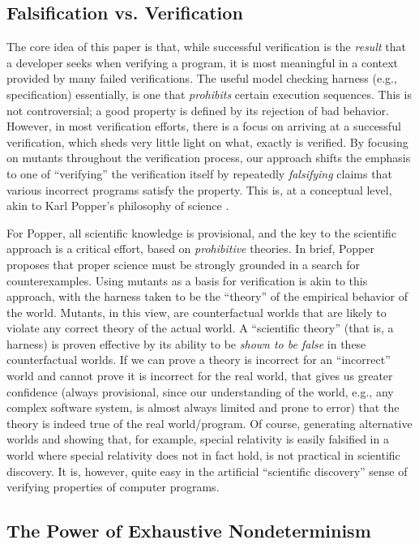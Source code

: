\documentclass[conference]{IEEEtran}
\begin{document}
\subsection{Falsification vs. Verification}

The core idea of this paper is that, while successful verification is
the \emph{result} that a developer seeks when verifying a program, it
is most meaningful in a context provided by many failed verifications.
The useful model checking harness (e.g., specification) essentially,
is one that \emph{prohibits} certain execution sequences.  This is not
controversial; a good property is defined by its rejection of bad
behavior.  However, in most verification efforts, there is a focus on
arriving at a successful verification, which sheds very little light
on what, exactly is verified.  By focusing on mutants throughout the
verification process, our approach shifts the emphasis to one of
``verifying'' the verification itself by repeatedly \emph{falsifying}
claims that various incorrect programs satisfy the property.  This is,
at a conceptual level, akin to Karl Popper's philosophy of science
\cite{Popper}.

For Popper, all scientific knowledge is provisional, and the key to
the scientific approach is a critical effort, based on
\emph{prohibitive} theories.  In brief, Popper proposes that proper
science must be strongly grounded in a search for counterexamples.
Using mutants as a basis for verification is akin to this approach,
with the harness taken to be the ``theory'' of the empirical behavior
of the world.  Mutants, in this view, are counterfactual worlds that
are likely to violate any correct theory of the actual world.  A
``scientific theory'' (that is, a harness) is proven effective by its
ability to be \emph{shown to be false} in these counterfactual worlds.
If we can prove a theory is incorrect for an ``incorrect'' world and
cannot prove it is incorrect for the real world, that gives us greater
confidence (always provisional, since our understanding of the world,
e.g., any complex software system, is almost always limited and prone
to error) that the theory is indeed true of the real world/program.
Of course, generating alternative worlds and showing that, for
example, special relativity is easily falsified in a world where
special relativity does not in fact hold, is not practical in
scientific discovery.  It is, however, quite easy in the artificial
``scientific discovery'' sense of verifying properties of computer programs.

\subsection{The Power of Exhaustive Nondeterminism}
\end{document}
